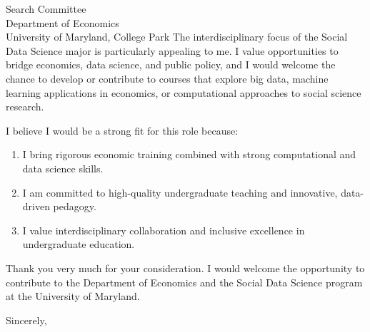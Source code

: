 \documentclass[11pt,letterpaper]{letter}
\begin{document}
\begin{letter}{
Search Committee \\
Department of Economics \\
University of Maryland, College Park
}
The interdisciplinary focus of the Social Data Science major is particularly appealing to me. I value opportunities to bridge economics, data science, and public policy, and I would welcome the chance to develop or contribute to courses that explore big data, machine learning applications in economics, or computational approaches to social science research.

I believe I would be a strong fit for this role because:
\begin{enumerate}
    \item I bring rigorous economic training combined with strong computational and data science skills.
    \item I am committed to high-quality undergraduate teaching and innovative, data-driven pedagogy.
    \item I value interdisciplinary collaboration and inclusive excellence in undergraduate education.
\end{enumerate}

Thank you very much for your consideration. I would welcome the opportunity to contribute to the Department of Economics and the Social Data Science program at the University of Maryland.

\closing{Sincerely,}

\end{letter}
\end{document}
